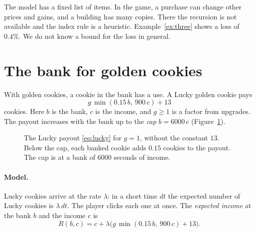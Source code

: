 \documentclass[11pt]{article}
\theoremstyle{boxed}
\begin{document}
The model has a fixed list of items. In the game, a purchase can change other prices and gains,
and a building has many copies. There the recursion is not available and the index rule is a
heuristic. Example~\ref{ex:three} shows a loss of $0.4\%$. We do not know a bound for the loss
in general.

\section{The bank for golden cookies}\label{sec:bank}

With golden cookies, a cookie in the bank has a use. A Lucky golden cookie pays
\begin{equation}\label{eq:lucky}
  g\,\min(0.15\,b,\ 900\,c)+13
\end{equation}
cookies. Here $b$ is the bank, $c$ is the income, and $g\ge1$ is a factor from upgrades. The
payout increases with the bank up to the \emph{cap} $b=6000\,c$ (Figure~\ref{fig:lucky}).

\begin{figure}[ht]
\centering
{}
\caption{The Lucky payout \eqref{eq:lucky} for $g=1$, without the constant $13$. Below the cap,
each banked cookie adds $0.15$ cookies to the payout. The cap is at a bank of $6000$ seconds of
income.}\label{fig:lucky}
\end{figure}

\paragraph{Model.} Lucky cookies arrive at the rate $\lambda$: in a short time $dt$ the
expected number of Lucky cookies is $\lambda\,dt$. The player clicks each one at once. The
\emph{expected income} at the bank $b$ and the income $c$ is
\[
  R(b,c)=c+\lambda\bigl(g\,\min(0.15\,b,\ 900\,c)+13\bigr).
\]
\end{document}

